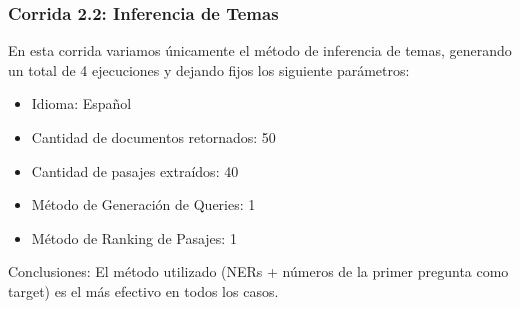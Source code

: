 \begin{frame}
\frametitle{Corrida 2.2: Inferencia de Temas}

En esta corrida variamos únicamente el método de inferencia de temas, generando un total de 4 ejecuciones y dejando fijos los siguiente parámetros: \newline


\begin{itemize}
  \item Idioma: Español
  \item Cantidad de documentos retornados: 50
  \item Cantidad de pasajes extraídos: 40
  \item Método de Generación de Queries: 1
  \item Método de Ranking de Pasajes: 1
\end{itemize}

Conclusiones:
 El método utilizado (NERs + números de la primer pregunta como target) es el más efectivo en todos los casos.


\end{frame}

